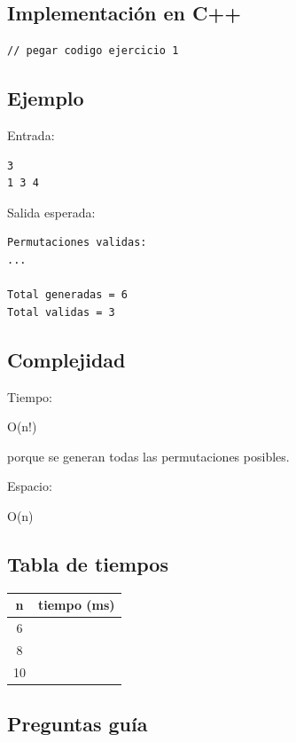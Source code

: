 \documentclass[12pt]{article}
\begin{document}
\subsection{Implementación en C++}

\begin{lstlisting}
// pegar codigo ejercicio 1
\end{lstlisting}

\subsection{Ejemplo}

Entrada:

\begin{verbatim}
3
1 3 4
\end{verbatim}

Salida esperada:

\begin{verbatim}
Permutaciones validas:
...

Total generadas = 6
Total validas = 3
\end{verbatim}

\subsection{Complejidad}

\begin{respuesta}

Tiempo:

O(n!)

porque se generan todas las permutaciones posibles.

Espacio:

O(n)

\end{respuesta}

\subsection{Tabla de tiempos}

\begin{center}
\begin{tabular}{|c|c|}
\hline
n & tiempo (ms) \\
\hline
6 & \\
8 & \\
10 & \\
\hline
\end{tabular}
\end{center}

\subsection{Preguntas guía}
\end{document}
